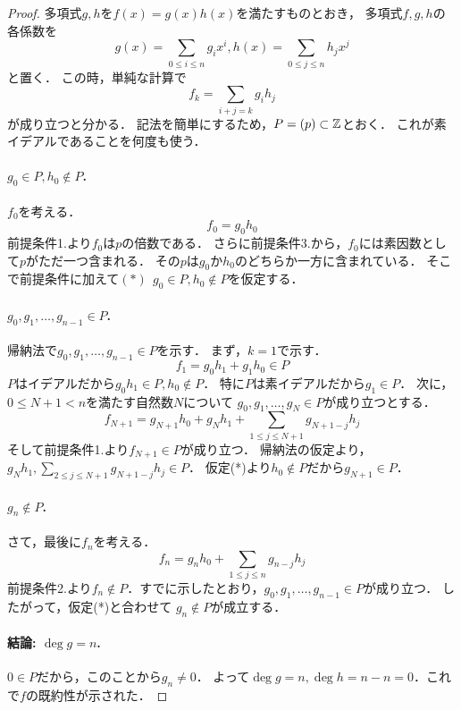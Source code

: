 \documentclass[a4j]{jsarticle}
\begin{document}
\begin{proof}
    多項式$g,h$を$f(x)=g(x) h(x)$を満たすものとおき，
    多項式$f, g, h$の各係数を
    \[ g(x)=\sum_{0 \leq i \leq n}{g_i x^i}, h(x)=\sum_{0 \leq j \leq n}{h_j x^j} \]
    と置く．
    この時，単純な計算で
    \[ f_{k}=\sum_{i+j=k}{g_i h_j} \]
    が成り立つと分かる．
    記法を簡単にするため，$P=(p) \subset \mathbb{Z}$とおく．
    これが素イデアルであることを何度も使う．

    \paragraph{$g_0 \in P, h_0 \not \in P$.}
    $f_0$を考える．
    \[ f_0=g_0 h_0 \]
    前提条件1.より$f_0$は$p$の倍数である．
    さらに前提条件3.から，$f_0$には素因数として$p$がただ一つ含まれる．
    その$p$は$g_0$か$h_0$のどちらか一方に含まれている．
    そこで前提条件に加えて$(*)~~g_0 \in P, h_0 \not \in P$を仮定する．

    \paragraph{$g_0, g_1, \dots, g_{n-1} \in P$.}
    帰納法で$g_0, g_1, \dots, g_{n-1} \in P$を示す．
    まず，$k=1$で示す．
    \[ f_1=g_0 h_1 + g_1 h_0 \in P \]
    $P$はイデアルだから$g_0 h_1 \in P, h_0 \not \in P$．
    特に$P$は素イデアルだから$g_1 \in P$．
    次に，$0 \leq N+1 < n$を満たす自然数$N$について
    $g_0, g_1, \dots, g_{N} \in P$が成り立つとする．
    \[ f_{N+1}=g_{N+1} h_0+g_{N} h_1+\sum_{1 \leq j \leq N+1}{g_{N+1-j} h_j } \]
    そして前提条件1.より$f_{N+1} \in P$が成り立つ．
    帰納法の仮定より，$g_{N} h_1, \sum_{2 \leq j \leq N+1}{g_{N+1-j} h_j } \in P$．
    仮定(*)より$h_0 \not \in P$だから$g_{N+1} \in P$．

    \paragraph{$g_n \not \in P$.}
    さて，最後に$f_n$を考える．
    \[ f_{n}=g_{n} h_0+\sum_{1 \leq j \leq n}{g_{n-j} h_j } \]
    前提条件2.より$f_{n} \not \in P$．すでに示したとおり，$g_0, g_1, \dots, g_{n-1} \in P$が成り立つ．
    したがって，仮定(*)と合わせて
    $g_n \not \in P$が成立する．

    \paragraph{結論: $\deg g=n$.}
    $0 \in P$だから，このことから$g_n \neq 0$．
    よって$\deg g=n, \deg h=n-n=0$．これで$f$の既約性が示された．
\end{proof}
\end{document}
